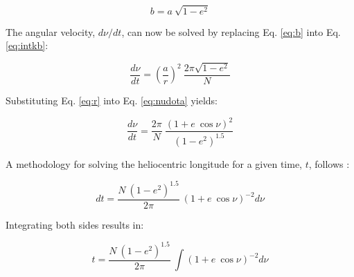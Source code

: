 \begin{equation}
\label{eq:b}
	b = a \: \sqrt{1 - e^2}
\end{equation} 

The angular velocity, $d\nu/dt$, can now be solved by replacing Eq. \ref{eq:b} into Eq. \ref{eq:intkb}:

\begin{equation}
\label{eq:nudota}
	\frac{d\nu}{dt} = \left(\frac{a}{r}\right)^2\:\frac{2\pi\sqrt{1-e^2}}{N}
\end{equation} 

Substituting Eq. \ref{eq:r} into Eq. \ref{eq:nudota} yields:

\begin{equation}
\label{eq:nudotb}
	\frac{d\nu}{dt} = \frac{2\pi}{N}\:\frac{\left(1+e\:\cos\nu\right)^2}
	                                      {\left(1-e^2\right)^{1.5}}
\end{equation} 

A methodology for solving the heliocentric longitude for a given time, $t$, follows \parencite{kutzbach88}:

\begin{equation}
\label{eq:dtdnu}
	dt = \frac{N\:\left(1-e^2\right)^{1.5}}{2\pi}\:\left(1+e\:\cos\nu\right)^{-2} d\nu
\end{equation}

\noindent Integrating both sides results in:

\begin{equation}
\label{eq:tdnu}
	t = \frac{N\:\left(1-e^2\right)^{1.5}}
	         {2\pi}\:\int\left(1+e\:\cos\nu\right)^{-2} d\nu
\end{equation}

